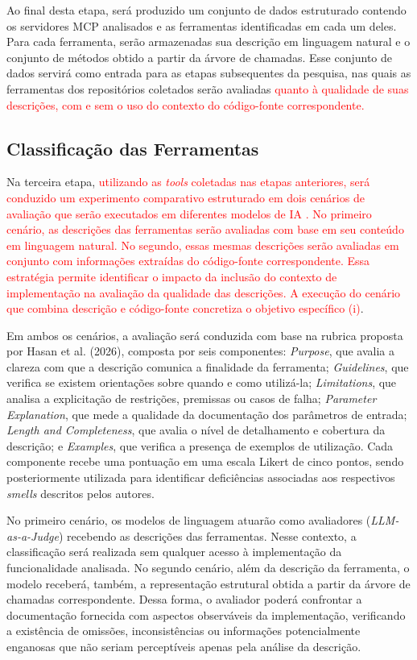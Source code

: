 Ao final desta etapa, será produzido um conjunto de dados estruturado contendo os servidores MCP analisados e as ferramentas identificadas em cada um deles. Para cada ferramenta, serão armazenadas sua descrição em linguagem natural e o conjunto de métodos obtido a partir da árvore de chamadas. Esse conjunto de dados servirá como entrada para as etapas subsequentes da pesquisa, nas quais as ferramentas dos repositórios coletados serão avaliadas  \textcolor{red}{quanto à qualidade de suas descrições, com e sem o uso do contexto do código-fonte correspondente.}

\subsection{Classificação das Ferramentas}

Na terceira etapa, \textcolor{red}{utilizando as \textit{tools} coletadas nas etapas anteriores, será conduzido um experimento comparativo estruturado em dois cenários de avaliação que serão executados em diferentes modelos de IA . No primeiro cenário, as descrições das ferramentas serão avaliadas com base em seu conteúdo em linguagem natural. No segundo, essas mesmas descrições serão avaliadas em conjunto com informações extraídas do código-fonte correspondente. Essa estratégia permite identificar o impacto da inclusão do contexto de implementação na avaliação da qualidade das descrições. A execução do cenário que combina descrição e código-fonte concretiza o objetivo específico (i)}.

Em ambos os cenários, a avaliação será conduzida com base na rubrica proposta por Hasan et al. (2026)\nocite{2026arXiv260214878M}, composta por seis componentes: \textit{Purpose}, que avalia a clareza com que a descrição comunica a finalidade da ferramenta; \textit{Guidelines}, que verifica se existem orientações sobre quando e como utilizá-la; \textit{Limitations}, que analisa a explicitação de restrições, premissas ou casos de falha; \textit{Parameter Explanation}, que mede a qualidade da documentação dos parâmetros de entrada; \textit{Length and Completeness}, que avalia o nível de detalhamento e cobertura da descrição; e \textit{Examples}, que verifica a presença de exemplos de utilização. Cada componente recebe uma pontuação em uma escala Likert de cinco pontos, sendo posteriormente utilizada para identificar deficiências associadas aos respectivos \textit{smells} descritos pelos autores.

No primeiro cenário, os modelos de linguagem atuarão como avaliadores (\textit{LLM-as-a-Judge}) recebendo as descrições das ferramentas. Nesse contexto, a classificação será realizada sem qualquer acesso à implementação da funcionalidade analisada. No segundo cenário, além da descrição da ferramenta, o modelo receberá, também, a representação estrutural obtida a partir da árvore de chamadas correspondente. Dessa forma, o avaliador poderá confrontar a documentação fornecida com aspectos observáveis da implementação, verificando a existência de omissões, inconsistências ou informações potencialmente enganosas que não seriam perceptíveis apenas pela análise da descrição.


